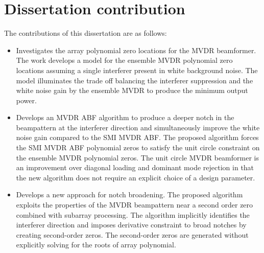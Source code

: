 

\section{Dissertation contribution}
\label{sec:contributions}
The contributions of this dissertation are as follows:
\begin{itemize}
\item Investigates the array polynomial zero locations for the MVDR
  beamformer. The work develops a model for the ensemble MVDR
  polynomial zero locations assuming a single interferer present in
  white background noise. The model illuminates the trade off balancing
  the interferer suppression and the white noise gain by the ensemble
  MVDR to produce the minimum output power.

\item Develops an MVDR ABF algorithm to produce a deeper notch in the
  beampattern at the interferer direction and simultaneously improve
  the white noise gain compared to the SMI MVDR ABF. The proposed
  algorithm forces the SMI MVDR ABF polynomial zeros to satisfy the
  unit circle constraint on the ensemble MVDR polynomial zeros. The
  unit circle MVDR beamformer is an improvement over diagonal loading
  and dominant mode rejection in that the new algorithm does not
  require an explicit choice of a design parameter.

\item Develops a new approach for notch broadening. The proposed
  algorithm exploits the properties of the MVDR beampattern near a
  second order zero combined with subarray processing. The algorithm
  implicitly identifies the interferer direction and imposes
  derivative constraint to broad notches by creating second-order
  zeros. The second-order zeros are generated without explicitly
  solving for the roots of array polynomial. 

\end{itemize}

